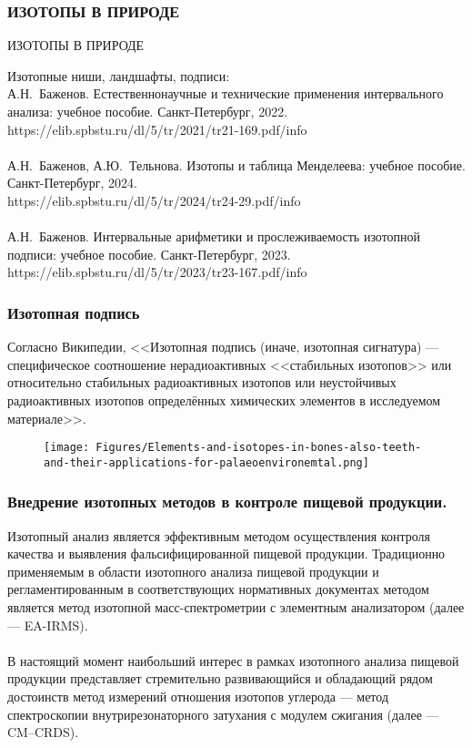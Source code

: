 \begin{frame}
\frametitle{ИЗОТОПЫ В ПРИРОДЕ}

\begin{center}
{\large
ИЗОТОПЫ В ПРИРОДЕ}
\end{center}

Изотопные ниши, ландшафты, подписи:\\
 А.Н.~Баженов.	Естественнонаучные и технические применения интервального анализа: учебное пособие. Санкт-Петербург, 2022.\\
 https://elib.spbstu.ru/dl/5/tr/2021/tr21-169.pdf/info\\
~\\
 А.Н.~Баженов, А.Ю.~Тельнова.	Изотопы и таблица Менделеева: учебное пособие. Санкт-Петербург, 2024.\\
 https://elib.spbstu.ru/dl/5/tr/2024/tr24-29.pdf/info\\
 ~\\
 А.Н.~Баженов.	Интервальные арифметики и прослеживаемость изотопной подписи: учебное пособие. Санкт-Петербург, 2023.\\
 https://elib.spbstu.ru/dl/5/tr/2023/tr23-167.pdf/info
 
\end{frame}


\begin{frame}
\frametitle{Изотопная подпись}
{\small
Согласно Википедии, <<Изотопная подпись (иначе, изотопная сигнатура) --- специфическое соотношение нерадиоактивных <<стабильных изотопов>> или относительно стабильных радиоактивных изотопов или неустойчивых радиоактивных изотопов определённых химических элементов в исследуемом материале>>. } %

\begin{figure}
	\centering\small
	\unitlength=1mm
	\texttt{[image: Figures/Elements-and-isotopes-in-bones-also-teeth-and-their-applications-for-palaeoenvironemtal.png]} 
	\label{f:Bones}
\end{figure}

\end{frame}


\begin{frame}
\frametitle{Внедрение изотопных методов в контроле пищевой продукции.}
{\small
Изотопный анализ является эффективным методом осуществления контроля качества и выявления
фальсифицированной пищевой продукции. Традиционно применяемым в области изотопного анализа пищевой
продукции и регламентированным в соответствующих нормативных документах методом является метод изотопной масс-спектрометрии с элементным анализатором (далее --- EA-IRMS).\\
~\\
В настоящий момент наибольший интерес в рамках изотопного анализа пищевой продукции представляет стремительно развивающийся и обладающий рядом достоинств метод измерений отношения изотопов углерода --- метод спектроскопии внутрирезонаторного затухания с модулем сжигания (далее --- CM–CRDS). 
} 
\end{frame}

